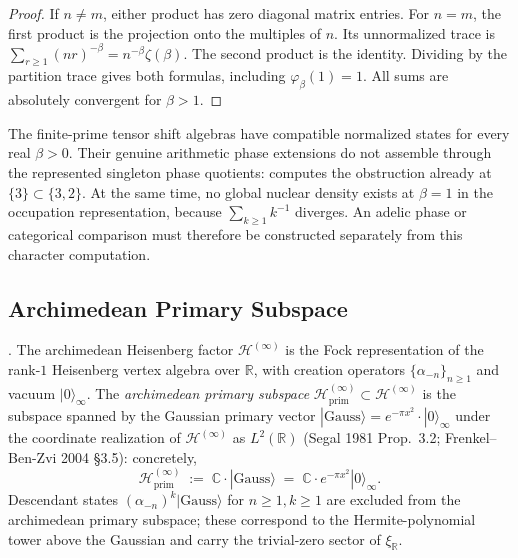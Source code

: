 \begin{proof}
If $n\ne m$, either product has zero diagonal matrix entries.
For $n=m$, the first product is the projection onto the multiples
of $n$. Its unnormalized trace is
$\sum_{r\geq1}(nr)^{-\beta}=n^{-\beta}\zeta(\beta)$.
The second product is the identity. Dividing by the partition
trace gives both formulas, including $\varphi_\beta(1)=1$.
All sums are absolutely convergent for $\beta>1$.
\end{proof}

The finite-prime tensor shift algebras have compatible normalized
states for every real $\beta>0$. Their genuine arithmetic phase
extensions do not assemble through the represented singleton
phase quotients: 
computes the obstruction already at $\{3\}\subset\{3,2\}$.
At the same time, no global nuclear density exists at $\beta=1$
in the occupation representation, because $\sum_{k\geq1}k^{-1}$
diverges. An adelic phase or categorical comparison must therefore
be constructed separately from this character computation.

\subsection{Archimedean Primary Subspace}
\label{v4-arith:prim-zeta:archimedean-primary}

\begin{definition}
\label{v4-arith:prim-zeta:def:arch-primary}
\ClaimStatusDefinitional. The archimedean Heisenberg factor
\(\mathcal{H}^{(\infty)}\) is the Fock representation of the rank-\(1\)
Heisenberg vertex algebra over \(\mathbb{R}\), with creation operators
\(\{\alpha_{-n}\}_{n\geq 1}\) and vacuum \(|0\rangle_{\infty}\). The
\emph{archimedean primary subspace}
\(\mathcal{H}^{(\infty)}_{\mathrm{prim}}\subset\mathcal{H}^{(\infty)}\)
is the subspace spanned by the Gaussian primary vector
\(|\text{Gauss}\rangle=e^{-\pi x^{2}}\cdot|0\rangle_{\infty}\) under the
coordinate realization of \(\mathcal{H}^{(\infty)}\) as
\(L^{2}(\mathbb{R})\) (Segal 1981 Prop.~3.2; Frenkel--Ben-Zvi 2004
\S3.5): concretely,
\begin{equation}
\label{v4-arith:prim-zeta:eq:arch-primary}
\mathcal{H}^{(\infty)}_{\mathrm{prim}}\;:=\;\mathbb{C}\cdot|\text{Gauss}\rangle\;=\;\mathbb{C}\cdot e^{-\pi x^{2}}|0\rangle_{\infty}.
\end{equation}
Descendant states \((\alpha_{-n})^{k}|\text{Gauss}\rangle\) for
\(n\geq 1,k\geq 1\) are excluded from the archimedean primary
subspace; these correspond to the Hermite-polynomial tower above the
Gaussian and carry the trivial-zero sector of \(\xi_{\mathbb R}\).
\end{definition}

